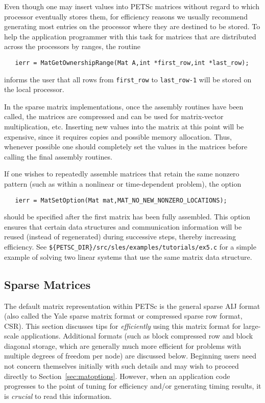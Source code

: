 Even though one may insert values into PETSc matrices without regard
to which processor eventually stores them, for efficiency
reasons we usually recommend generating most entries on the
processor where they are destined to be stored.  To help the
application programmer with this task for matrices that are
distributed across the processors by ranges, the routine
\begin{verbatim}
   ierr = MatGetOwnershipRange(Mat A,int *first_row,int *last_row);
\end{verbatim}
informs the user that all rows from {\tt first\_row} to 
{\tt last\_row-1} will be stored on the local processor.

In the sparse matrix implementations, once the assembly routines have been 
called, the matrices are compressed and can be used for matrix-vector
multiplication, etc.
Inserting new values into the matrix at this point will be expensive, 
since it requires copies and possible memory allocation. Thus, whenever 
possible one should completely set the values in the matrices before 
calling the final assembly routines. 

If one wishes to repeatedly assemble matrices that retain the same
nonzero pattern (such as within a nonlinear or time-dependent
problem), the option
\begin{verbatim}
   ierr = MatSetOption(Mat mat,MAT_NO_NEW_NONZERO_LOCATIONS);
\end{verbatim}
should be specified after the first matrix has been fully assembled.
This option ensures that certain data structures and communication
information will be reused (instead of regenerated) during successive
steps, thereby increasing efficiency.  
See {\tt \$\{PETSC\_DIR\}/src/sles/examples/tutorials/ex5.c} for a simple example of
solving two linear systems that use the same matrix data structure.

\subsection{Sparse Matrices}
\label{sec:matsparse}

 
The default matrix representation within PETSc is the general sparse
AIJ format (also called the Yale sparse matrix format or compressed
sparse row format, CSR).  This section discusses tips for {\em
efficiently} using this matrix format for large-scale
applications. Additional formats (such as block compressed row and
block diagonal storage, which are generally much more efficient for
problems with multiple degrees of freedom per node) are discussed
below.  Beginning users need not concern themselves initially with
such details and may wish to proceed directly to
Section~\ref{sec:matoptions}.  However, when an application code
progresses to the point of tuning for efficiency and/or generating
timing results, it is {\em crucial} to read this information.

